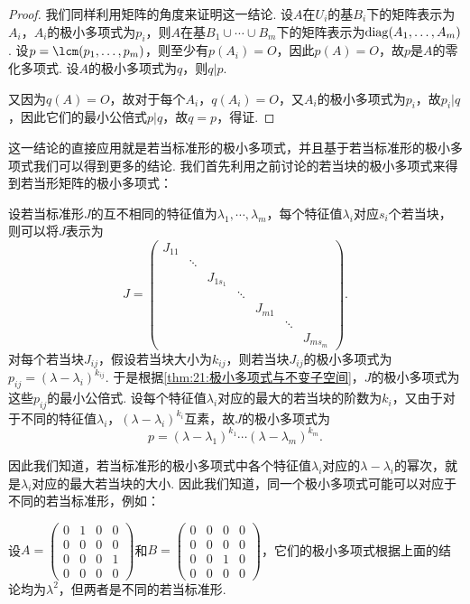 \begin{proof}
    我们同样利用矩阵的角度来证明这一结论. 设$A$在$U_i$的基$B_i$下的矩阵表示为$A_i$，$A_i$的极小多项式为$p_i$，则$A$在基$B_1\cup\cdots\cup B_m$下的矩阵表示为$\operatorname{diag}(A_1,\ldots,A_m)$. 设$p=\lcm(p_1,\ldots,p_m)$，则至少有$p(A_i)=O$，因此$p(A)=O$，故$p$是$A$的零化多项式. 设$A$的极小多项式为$q$，则$q\vert p$.

    又因为$q(A)=O$，故对于每个$A_i$，$q(A_i)=O$，又$A_i$的极小多项式为$p_i$，故$p_i\vert q$，因此它们的最小公倍式$p\vert q$，故$q=p$，得证.
\end{proof}

这一结论的直接应用就是若当标准形的极小多项式，并且基于若当标准形的极小多项式我们可以得到更多的结论. 我们首先利用之前讨论的若当块的极小多项式来得到若当形矩阵的极小多项式：
\begin{example} \label{thm:21:若当极小多项式}
    设若当标准形$J$的互不相同的特征值为$\lambda_1,\cdots,\lambda_m$，每个特征值$\lambda_i$对应$s_i$个若当块，则可以将$J$表示为
    \[J=\begin{pmatrix}
        J_{11} & & & & & & \\
        & \ddots & & & & & \\
        & & J_{1s_1} & & & & \\
        & & & \ddots & & & \\
        & & & & J_{m1} & & \\
        & & & & & \ddots & \\
        & & & & & & J_{ms_m}
    \end{pmatrix}.\]
    对每个若当块$J_{ij}$，假设若当块大小为$k_{ij}$，则若当块$J_{ij}$的极小多项式为$p_{ij}=(\lambda-\lambda_i)^{k_{ij}}$. 于是根据\autoref{thm:21:极小多项式与不变子空间}，$J$的极小多项式为这些$p_{ij}$的最小公倍式. 设每个特征值$\lambda_i$对应的最大的若当块的阶数为$k_i$，又由于对于不同的特征值$\lambda_i$，$(\lambda-\lambda_i)^{k_i}$互素，故$J$的极小多项式为
    \[p=(\lambda-\lambda_1)^{k_1}\cdots(\lambda-\lambda_m)^{k_m}.\]
\end{example}

因此我们知道，若当标准形的极小多项式中各个特征值$\lambda_i$对应的$\lambda-\lambda_i$的幂次，就是$\lambda_i$对应的最大若当块的大小. 因此我们知道，同一个极小多项式可能可以对应于不同的若当标准形，例如：
\begin{example}
    设$A=\begin{pmatrix}
        0 & 1 & 0 & 0 \\ 0 & 0 & 0 & 0 \\ 0 & 0 & 0 & 1 \\ 0 & 0 & 0 & 0
    \end{pmatrix}$和$B=\begin{pmatrix}
        0 & 0 & 0 & 0 \\ 0 & 0 & 0 & 0 \\ 0 & 0 & 1 & 0 \\ 0 & 0 & 0 & 0
    \end{pmatrix}$，它们的极小多项式根据上面的结论均为$\lambda^2$，但两者是不同的若当标准形.
\end{example}

